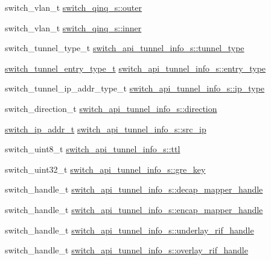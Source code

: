 \begin{DoxyCompactItemize}
\item 
switch\+\_\+vlan\+\_\+t \hyperlink{group__Tunnel_ga49a0974681b01e892b9518aa253488df}{switch\+\_\+qinq\+\_\+s\+::outer}
\item 
switch\+\_\+vlan\+\_\+t \hyperlink{group__Tunnel_gaf1d9443f4c5a0701ae353c0917065ab8}{switch\+\_\+qinq\+\_\+s\+::inner}
\item 
switch\+\_\+tunnel\+\_\+type\+\_\+t \hyperlink{group__Tunnel_ga6685d34b1ba33c1f547b06b6a9237a62}{switch\+\_\+api\+\_\+tunnel\+\_\+info\+\_\+s\+::tunnel\+\_\+type}
\item 
\hyperlink{group__Tunnel_ga8c691aa3424f01425814cccd5c076e44}{switch\+\_\+tunnel\+\_\+entry\+\_\+type\+\_\+t} \hyperlink{group__Tunnel_ga08132f7df2f5c508bde52a738ea627fd}{switch\+\_\+api\+\_\+tunnel\+\_\+info\+\_\+s\+::entry\+\_\+type}
\item 
switch\+\_\+tunnel\+\_\+ip\+\_\+addr\+\_\+type\+\_\+t \hyperlink{group__Tunnel_ga216a84a9b59dfb89fcc2233add2d2dfb}{switch\+\_\+api\+\_\+tunnel\+\_\+info\+\_\+s\+::ip\+\_\+type}
\item 
switch\+\_\+direction\+\_\+t \hyperlink{group__Tunnel_gacd286841672592eab97054f29f43f797}{switch\+\_\+api\+\_\+tunnel\+\_\+info\+\_\+s\+::direction}
\item 
\hyperlink{structswitch__ip__addr__s}{switch\+\_\+ip\+\_\+addr\+\_\+t} \hyperlink{group__Tunnel_ga9be28d9bd055ac1af0f30d36dce3113e}{switch\+\_\+api\+\_\+tunnel\+\_\+info\+\_\+s\+::src\+\_\+ip}
\item 
switch\+\_\+uint8\+\_\+t \hyperlink{group__Tunnel_ga86a3834db1f6b212b027d1f652021ffc}{switch\+\_\+api\+\_\+tunnel\+\_\+info\+\_\+s\+::ttl}
\item 
switch\+\_\+uint32\+\_\+t \hyperlink{group__Tunnel_gae83720f8c95f2c463c79af35ddda9530}{switch\+\_\+api\+\_\+tunnel\+\_\+info\+\_\+s\+::gre\+\_\+key}
\item 
switch\+\_\+handle\+\_\+t \hyperlink{group__Tunnel_ga48608d8e6f79b52969707065beab3b29}{switch\+\_\+api\+\_\+tunnel\+\_\+info\+\_\+s\+::decap\+\_\+mapper\+\_\+handle}
\item 
switch\+\_\+handle\+\_\+t \hyperlink{group__Tunnel_gaf221e7b6dc190d612ae79c4a47087637}{switch\+\_\+api\+\_\+tunnel\+\_\+info\+\_\+s\+::encap\+\_\+mapper\+\_\+handle}
\item 
switch\+\_\+handle\+\_\+t \hyperlink{group__Tunnel_ga37daad6891f426ccac9ea1c7f750a443}{switch\+\_\+api\+\_\+tunnel\+\_\+info\+\_\+s\+::underlay\+\_\+rif\+\_\+handle}
\item 
switch\+\_\+handle\+\_\+t \hyperlink{group__Tunnel_ga1ad550339f0fde32bb88063b0141a0cc}{switch\+\_\+api\+\_\+tunnel\+\_\+info\+\_\+s\+::overlay\+\_\+rif\+\_\+handle}

\end{DoxyCompactItemize}
